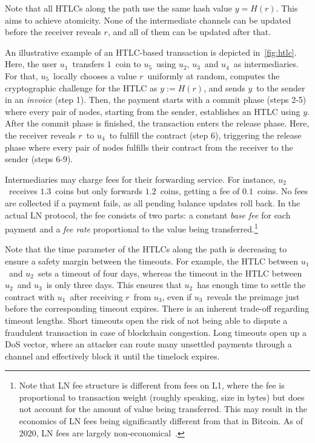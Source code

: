 Note that all HTLCs along the path use the same hash value $y=H(r)$.
This aims to achieve atomicity.
None of the intermediate channels can be updated before the receiver reveals $r$, and all of them can be updated after that.

An illustrative example of an HTLC-based transaction is depicted in~\cref{fig:htlc}.
Here, the user $u_1$~transfers $1$~coin to $u_5$~using $u_2$, $u_3$~and $u_4$~as intermediaries.
For that, $u_5$~locally chooses a value $r$~uniformly at random, computes the cryptographic challenge for the HTLC as $y := H(r)$, and sends $y$~to the sender in an \textit{invoice} (step 1).
Then, the payment starts with a commit phase (steps 2-5) where every pair of nodes, starting from the sender, establishes an HTLC using $y$.
After the commit phase is finished, the transaction enters the release phase.
Here, the receiver reveals $r$~to $u_4$~to fulfill the contract (step 6), triggering the release phase where every pair of nodes fulfills their contract from the receiver to the sender (steps 6-9).

Intermediaries may charge fees for their forwarding service.
For instance, $u_2$~receives $1.3$~coins but only forwards $1.2$~coins, getting a fee of $0.1$~coins.
No fees are collected if a payment fails, as all pending balance updates roll back.
In the actual LN protocol, the fee consists of two parts: a constant \textit{base fee} for each payment and a \textit{fee rate} proportional to the value being transferred.\footnote{Note that LN fee structure is different from fees on L1, where the fee is proportional to transaction weight (roughly speaking, size in bytes) but does not account for the amount of value being transferred. This may result in the economics of LN fees being significantly different from that in Bitcoin. As of 2020, LN fees are largely non-economical~\cite{Beres2019}.}

Note that the time parameter of the HTLCs along the path is decreasing to ensure a safety margin between the timeouts.
For example, the HTLC between $u_1$~and $u_2$~sets a timeout of four days, whereas the timeout in the HTLC between $u_2$~and $u_3$~is only three days.
This ensures that $u_2$~has enough time to settle the contract with $u_1$~after receiving $r$~from $u_3$, even if $u_3$~reveals the preimage just before the corresponding timeout expires.
There is an inherent trade-off regarding timeout lengths.
Short timeouts open the risk of not being able to dispute a fraudulent transaction in case of blockchain congestion.
Long timeouts open up a DoS vector, where an attacker can route many unsettled payments through a channel and effectively block it until the timelock expires.

